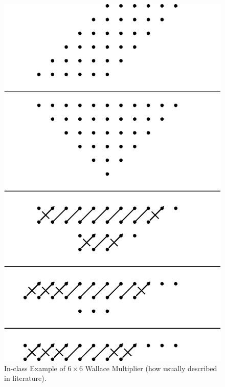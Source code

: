 \documentclass{article}
\begin{document}
  \begin{figure}
    \begin{center}
      \includegraphics[scale=1.0]{wallace6l.eps}
    \end{center}
    \label{wallace6l.fig}
    \caption{In-class Example of $6 \times 6$ Wallace Multiplier (how usually
    described in literature).}
  \end{figure}
\end{document}
